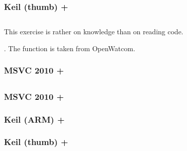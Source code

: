 \subsubsection{Keil (thumb) + \Othree}



\subsection{}

{This exercise is rather on knowledge than on reading code.}

.
{The function is taken from OpenWatcom}.

\subsubsection{MSVC 2010 + \Ox}



\subsection{}

\subsubsection{MSVC 2010 + \Ox}



\subsubsection{Keil (ARM) + \Othree}



\subsubsection{Keil (thumb) + \Othree}



\subsection{}

